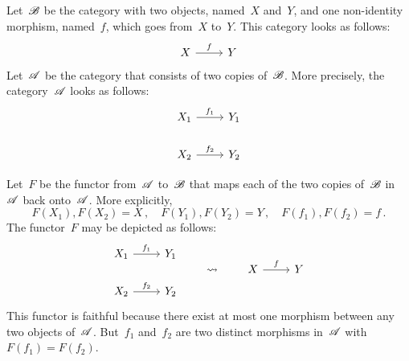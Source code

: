 \subsection{}

Let~$\mathscr{B}$ be the category with two objects, named~$X$ and~$Y$, and one non-identity morphism, named~$f$, which goes from~$X$ to~$Y$.
This category looks as follows:
\[
	\begin{tikzcd}
		X
		\arrow{r}[above]{f}
		&
		Y
	\end{tikzcd}
\]
Let~$\mathscr{A}$ be the category that consists of two copies of~$\mathscr{B}$.
More precisely, the category~$\mathscr{A}$ looks as follows:
\[
	\begin{tikzcd}
		X_1
		\arrow{r}[above]{f_1}
		&
		Y_1
		\\
		X_2
		\arrow{r}[above]{f_2}
		&
		Y_2
	\end{tikzcd}
\]

Let~$F$ be the functor from~$\mathscr{A}$ to~$\mathscr{B}$ that maps each of the two copies of~$\mathscr{B}$ in~$\mathscr{A}$ back onto~$\mathscr{A}$.
More explicitly,
\[
	F(X_1), F(X_2) = X \,,
	\quad
	F(Y_1), F(Y_2) = Y \,,
	\quad
	F(f_1), F(f_2) = f \,.
\]
The functor~$F$ may be depicted as follows:
\[
	\begin{tikzcd}
		X_1
		\arrow{r}[above]{f_1}
		&
		Y_1
		\\
		X_2
		\arrow{r}[above]{f_2}
		&
		Y_2
	\end{tikzcd}
	\qquad\leadsto\qquad
	\begin{tikzcd}
		X
		\arrow{r}[above]{f}
		&
		Y
	\end{tikzcd}
\]
This functor is faithful because there exist at most one morphism between any two objects of~$\mathscr{A}$.
But~$f_1$ and~$f_2$ are two distinct morphisms in~$\mathscr{A}$ with~$F(f_1) = F(f_2)$.
